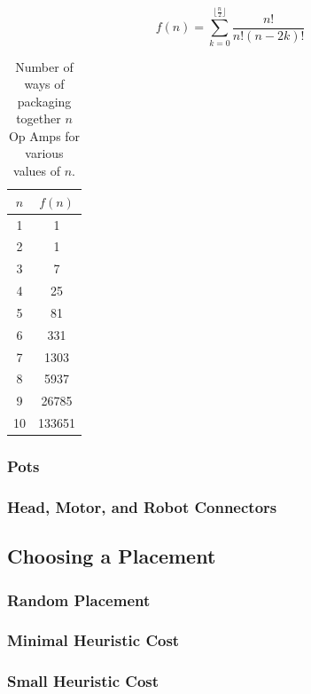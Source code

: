 \begin{equation}
f(n) = \sum\limits_{k=0}^{\lfloor\frac{n}{2}\rfloor}{\frac{n!}{n!(n - 2k)!}}
\label{eq:opamp}
\end{equation}

\begin{table}
\begin{center}
\begin{singlespace}
\begin{tabular}{c | c}
$n$ & $f(n)$ \\
\hline
\hline
1 & 1 \\
2 & 1 \\
3 & 7 \\
4 & 25 \\
5 & 81 \\
6 & 331 \\
7 & 1303 \\
8 & 5937 \\
9 & 26785 \\
10 & 133651
\end{tabular}
\end{singlespace}
\end{center}
\label{tb:opamp}
\caption{Number of ways of packaging together $n$ Op Amps for various values of
$n$.}
\end{table}

\subsubsection{Pots}

\subsubsection{Head, Motor, and Robot Connectors}

\subsection{Choosing a Placement}

\subsubsection{Random Placement}

\subsubsection{Minimal Heuristic Cost}

\subsubsection{Small Heuristic Cost}

